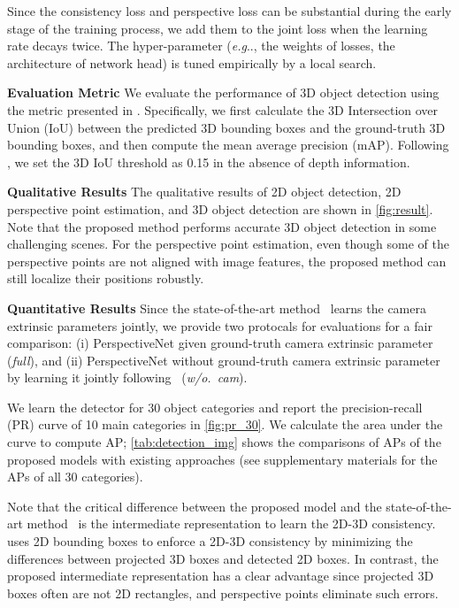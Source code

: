 \documentclass{article}
\makeatletter
\DeclareRobustCommand\onedot{\futurelet\@let@token\@onedot}
\def\@onedot{\ifx\@let@token.\else.\null\fi\xspace}
\def\eg{\emph{e.g}\onedot} \def\Eg{\emph{E.g}\onedot}
\makeatother
\begin{document}
Since the consistency loss and perspective loss can be substantial during the early stage of the training process, we add them to the joint loss when the learning rate decays twice. The hyper-parameter (\eg, the weights of losses, the architecture of network head) is tuned empirically by a local search.

\textbf{Evaluation Metric}\quad{} We evaluate the performance of 3D object detection using the metric presented in \citet{song2015sun}. Specifically, we first calculate the 3D Intersection over Union (IoU) between the predicted 3D bounding boxes and the ground-truth 3D bounding boxes, and then compute the mean average precision (mAP). Following \citet{huang2018cooperative}, we set the 3D IoU threshold as 0.15 in the absence of depth information. 

\textbf{Qualitative Results}\quad{} The qualitative results of 2D object detection, 2D perspective point estimation, and 3D object detection are shown in \autoref{fig:result}. Note that the proposed method performs accurate 3D object detection in some challenging scenes. For the perspective point estimation, even though some of the perspective points are not aligned with image features, the proposed method can still localize their positions robustly. 

\textbf{Quantitative Results}\quad{} Since the state-of-the-art method~\cite{huang2018cooperative} learns the camera extrinsic parameters jointly, we provide two protocals for evaluations for a fair comparison: (i) PerspectiveNet given ground-truth camera extrinsic parameter (\emph{full}), and (ii) PerspectiveNet without ground-truth camera extrinsic parameter by learning it jointly following~\cite{huang2018cooperative} (\emph{w/o.~cam}).

We learn the detector for 30 object categories and report the precision-recall (PR) curve of 10 main categories in \autoref{fig:pr_30}. We calculate the area under the curve to compute AP; \autoref{tab:detection_img} shows the comparisons of APs of the proposed models with existing approaches (see supplementary materials for the APs of all 30 categories).


Note that the critical difference between the proposed model and the state-of-the-art method~\cite{huang2018cooperative} is the intermediate representation to learn the 2D-3D consistency. \citet{huang2018cooperative} uses 2D bounding boxes to enforce a 2D-3D consistency by minimizing the differences between projected 3D boxes and detected 2D boxes. In contrast, the proposed intermediate representation has a clear advantage since projected 3D boxes often are not 2D rectangles, and perspective points eliminate such errors.
\end{document}
